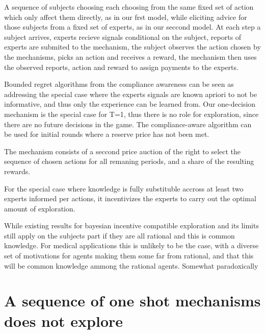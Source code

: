 
 A sequence of subjects choosing each choosing from the same fixed set of action which only affect them directly, as in our frst model, while eliciting advice for those subjects from a fixed set of experts, as in our seccond model. 
At each step a subject arrives, experts recieve signals conditional on the subject, reports of experts are submited to the mechanism, the subject observes the action chosen by the mechanisms, picks an action and receives a reward, the mechanism then uses the observed reports, action and reward to assign payments to the experts.

Bounded regret algorithms from the compliance awareness can be seen as addressing the special case where the experts signals are known apriori to not be informative, and thus only the experience can be learned from. Our one-decision mechanism is the special case for T=1, thus there is no role for exploration, since there are no future decisions in the game.
The compliance-aware algorithm can be used for initial rounds where a reserve price has not been met.

The mechanism consists of a seccond price auction of the right to select the sequence of chosen actions for all remaning periods, and a share of the resulting rewards.

For the special case where knowledge is  fully substituble accross at least two experts informed per actions, it incentivizes the experts to carry out the optimal amount of exploration. 

While existing results for bayesian incentive compatible exploration and its limits still apply on the subjects part if they are all rational and this is common knowledge. For medical applications this is unlikely to be the case, with a diverse set of motivations for agents making them some far from rational, and that this will be common knowledge ammong the rational agents. Somewhat paradoxically 



\section{A sequence of one shot mechanisms does not explore}


